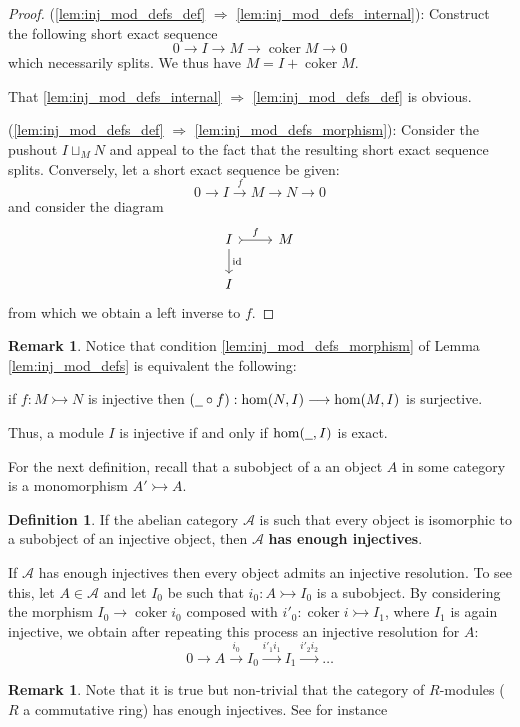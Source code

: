 \documentclass[12pt]{article}
\theoremstyle{plain}
\theoremstyle{definition}
\newtheorem{defn}[thm]{Definition} %
\newtheorem{remark}[thm]{Remark}
\newcommand{\scr}[1]{\mathscr{#1}}
\newcommand{\und}[1]{\underline{\hspace{#1 cm}}}
\newcommand{\lto}{\longrightarrow}
\begin{document}
\begin{proof}
(\ref{lem:inj_mod_defs_def} $\Rightarrow$ \ref{lem:inj_mod_defs_internal}): Construct the following short exact sequence
\begin{equation}
0 \lto I \lto M \lto \operatorname{coker}M \lto 0
\end{equation}
which necessarily splits. We thus have $M = I + {\operatorname{coker}M}$.

That \ref{lem:inj_mod_defs_internal} $\Rightarrow$ \ref{lem:inj_mod_defs_def} is obvious.

(\ref{lem:inj_mod_defs_def} $\Rightarrow$ \ref{lem:inj_mod_defs_morphism}): Consider the pushout $I \sqcup_M N$ and appeal to the fact that the resulting short exact sequence splits. Conversely, let a short exact sequence be given:
\begin{equation}
0 \lto I \stackrel{f}{\lto} M \lto N \lto 0
\end{equation}
and consider the diagram
\begin{equation}
\begin{tikzcd}
I\arrow[r,rightarrowtail,"f"]\arrow[d,"{\operatorname{id}}"]& M\\
I
\end{tikzcd}
\end{equation}
from which we obtain a left inverse to $f$.
\end{proof}
\begin{remark}
Notice that condition \ref{lem:inj_mod_defs_morphism} of Lemma \ref{lem:inj_mod_defs} is equivalent the following:

if $f: M \rightarrowtail N$ is injective then $(\und{0.2} \circ f): \operatorname{hom}(N, I) \lto \operatorname{hom}(M,I)$ is surjective.

Thus, a module $I$ is injective if and only if $\operatorname{hom}(\und{0.2},I)$ is exact.
\end{remark}
For the next definition, recall that a subobject of a an object $A$ in some category is a monomorphism $A' \rightarrowtail A$.
\begin{defn}
If the abelian category $\scr{A}$ is such that every object is isomorphic to a subobject of an injective object, then $\scr{A}$ \textbf{has enough injectives}.
\end{defn}
If $\scr{A}$ has enough injectives then every object admits an injective resolution. To see this, let $A \in \scr{A}$ and let $I_0$ be such that $i_0: A \rightarrowtail I_0$ is a subobject. By considering the morphism $I_0 \lto \operatorname{coker}i_0$ composed with $i'_0: \operatorname{coker}i \rightarrowtail I_1$, where $I_1$ is again injective, we obtain after repeating this process an injective resolution for $A$:
\begin{equation}
0 \lto A \stackrel{i_0}{\lto} I_0 \stackrel{i'_1i_1}{\lto} I_1 \stackrel{i'_2i_2}{\lto}\hdots
\end{equation}
\begin{remark}
Note that it is true but non-trivial that the category of $R$-modules ($R$ a commutative ring) has enough injectives. See for instance \cite{chung}
\end{remark}
\end{document}
